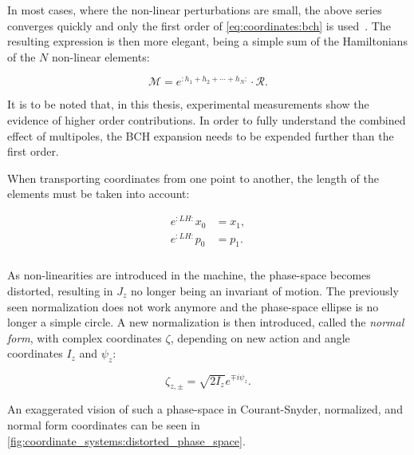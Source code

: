 In most cases, where the non-linear perturbations are small, the above series converges quickly
and only the first order of \cref{eq:coordinates:bch} is
used~\cite{carlier_nonlinear_2020-1}. The resulting expression is then more elegant, being a simple
sum of the Hamiltonians of the $N$ non-linear elements:

\begin{equation}
   \mathcal{M} = e^{:h_1 + h_2 + \cdots + h_N:} \cdot \mathcal{R}.
\end{equation}

It is to be noted that, in this thesis, experimental measurements show the evidence of higher
order contributions. In order to fully understand the combined effect of multipoles, the BCH
expansion needs to be expended further than the first order.

When transporting coordinates from one point to another, the length of the elements must be taken
into account:

\begin{equation}
    \begin{aligned}
        e^{:LH:} x_0 &= x_1,\\
        e^{:LH:} p_0 &= p_1.
    \end{aligned}
\end{equation}


\subsubsection{}

As non-linearities are introduced in the machine, the phase-space becomes distorted, resulting in
$J_z$ no longer being an invariant of motion. The previously seen normalization does not work
anymore and the phase-space ellipse is no longer a simple circle. A new normalization is then
introduced, called the \textit{normal form}, with complex coordinates $\zeta$, depending on new
action and angle coordinates $I_z$ and $\psi_z$:

\begin{equation}
    \zeta_{z,\pm} = \sqrt{2I_z} e^{\mp i \psi_z}.
    \label{eq:coordinate_systems:normal_form_coordinates}
\end{equation}

An exaggerated vision of such a phase-space in Courant-Snyder, normalized, and normal form
coordinates can be seen in \cref{fig:coordinate_systems:distorted_phase_space}.

